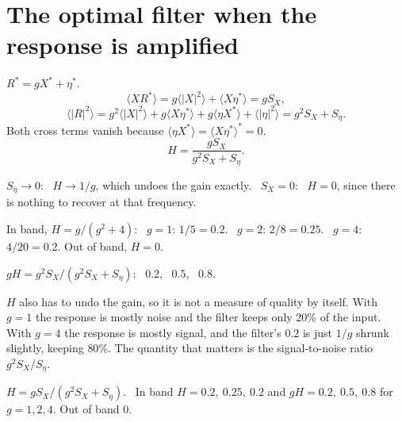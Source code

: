 \documentclass[11pt,letterpaper]{article}
\newcommand{\ans}[1]{\par\vspace{4pt}{\bfseries #1}\quad}
\begin{document}
\section{The optimal filter when the response is amplified}

\ans{(a)}
$R^* = gX^* + \eta^*$.
\[
\langle X R^* \rangle = g\langle |X|^2 \rangle + \langle X\eta^* \rangle = g S_X,
\]
\[
\langle |R|^2 \rangle = g^2 \langle |X|^2 \rangle + g\langle X\eta^* \rangle + g\langle \eta X^* \rangle + \langle |\eta|^2 \rangle = g^2 S_X + S_\eta .
\]
Both cross terms vanish because $\langle \eta X^* \rangle = \langle X \eta^* \rangle^* = 0$.
\[
H = \frac{g S_X}{g^2 S_X + S_\eta} .
\]

\ans{(b)}
$S_\eta \to 0$: \ $H \to 1/g$, which undoes the gain exactly. \ $S_X = 0$: \ $H = 0$, since there is nothing to recover at that frequency.

\ans{(c)}
In band, $H = g/(g^2 + 4)$: \ $g = 1$: $1/5 = 0.2$. \ $g = 2$: $2/8 = 0.25$. \ $g = 4$: $4/20 = 0.2$. Out of band, $H = 0$.

\ans{(d)}
$gH = g^2 S_X / (g^2 S_X + S_\eta)$: \ $0.2$, \ $0.5$, \ $0.8$.

$H$ also has to undo the gain, so it is not a measure of quality by itself. With $g = 1$ the response is mostly noise and the filter keeps only $20\%$ of the input. With $g = 4$ the response is mostly signal, and the filter's $0.2$ is just $1/g$ shrunk slightly, keeping $80\%$. The quantity that matters is the signal-to-noise ratio $g^2 S_X / S_\eta$.
\begin{center}
\end{center}
\begin{result}
$H = gS_X/(g^2S_X + S_\eta)$. \ In band $H = 0.2,\ 0.25,\ 0.2$ and $gH = 0.2,\ 0.5,\ 0.8$ for $g = 1, 2, 4$. Out of band $0$.
\end{result}
\end{document}
